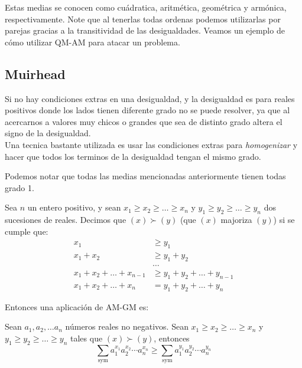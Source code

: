 \documentclass[11pt]{scrartcl}
\newcommand{\sym}{\text{sym}}
\begin{document}
\noindent
Estas medias se conocen como cu\'adratica, aritm\'etica, geom\'etrica y arm\'onica, respectivamente. Note que al tenerlas todas ordenas podemos utilizarlas por parejas gracias a la transitividad de las desigualdades. Veamos un ejemplo de c\'omo utilizar QM-AM para atacar un problema.\\




\subsection{Muirhead}

Si no hay condiciones extras en una desigualdad, y la desigualdad es para reales positivos donde los lados tienen diferente grado no se puede resolver, ya que al acercarnos a valores muy chicos o grandes que sea de distinto grado altera el signo de la desigualdad.  \\
Una tecnica bastante utilizada es usar las condiciones extras para \textit{homogenizar} y hacer que todos los terminos de la desigualdad tengan el mismo grado.

Podemos notar que todas las medias mencionadas anteriormente tienen todas grado 1. \\

\begin{definition}
Sea $n$ un entero positivo, y  sean $x_1\geq x_2 \geq \ldots\geq x_n$ y $y_1\geq y_2\geq \ldots\geq  y_n$ dos sucesiones de reales. Decimos que $(x) \succ (y)$ (que $(x)$ majoriza $(y)$) si se cumple que: 
\begin{align*}
    x_1 &\geq y_1 \\ 
    x_1+x_2 &\geq y_1+y_2 \\
    &\ldots \\ 
    x_1+x_2+\ldots +x_{n-1} &\geq y_1+y_2+\ldots +y_{n-1} \\ 
    x_1+x_2+\ldots+x_n &= y_1+y_2+\ldots+y_n
\end{align*}
\end{definition}

Entonces una aplicación de AM-GM es: 
\begin{theorem} [Muirhead]
    Sean $a_1,a_2, \ldots a_n$ números reales no negativos. Sean $x_1\geq x_2 \geq \ldots\geq x_n$ y $y_1\geq y_2\geq \ldots\geq  y_n$ tales que $(x) \succ (y)$, entonces 
\[\sum_{ \sym } a_1^{x_1}a_2^{x_2}\cdots a_n^{x_n} \geq \sum_{\sym} a_1^{y_1}a_2^{y_2}\cdots a_n^{y_n}\]
\end{theorem} 
\end{document}
